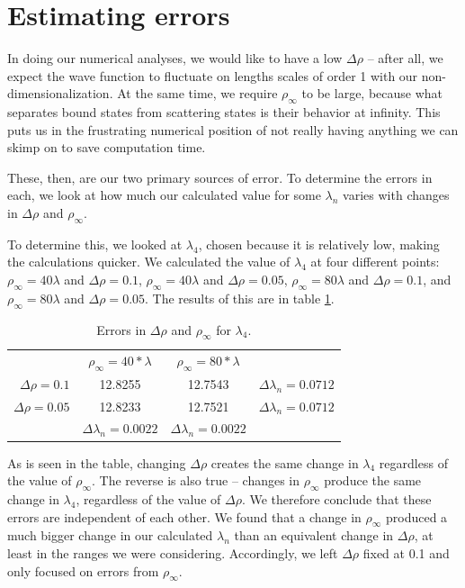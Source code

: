 \documentclass[12pt,twoside]{reedthesis}
\begin{document}
\section{Estimating errors}
In doing our numerical analyses, we would like to have a low $\Delta \rho$ -- after all, we expect the wave function to fluctuate on lengths scales of order 1 with our non-dimensionalization. At the same time, we require $\rho_{\infty}$ to be large, because what separates bound states from scattering states is their behavior at infinity. This puts us in the frustrating numerical position of not really having anything we can skimp on to save computation time.

These, then, are our two primary sources of error. To determine the errors in each, we look at how much our calculated value for some $\lambda_{n}$ varies with changes in $\Delta \rho$ and $\rho_{\infty}$.  

To determine this, we looked at $\lambda_{4}$, chosen because it is relatively low, making the calculations quicker. We calculated the value of $\lambda_{4}$ at four different points: $\rho_{\infty} = 40\lambda$ and $\Delta \rho = 0.1$, $\rho_{\infty} = 40\lambda$ and $\Delta \rho = 0.05$, $\rho_{\infty} = 80\lambda$ and $\Delta \rho = 0.1$, and $\rho_{\infty} = 80\lambda$ and $\Delta \rho = 0.05$. The results of this are in table \ref{tab:errorchanges}. 
\begin{table}
\centering
\begin{tabular}{r|c|c|c|}
\multicolumn{1}{r}{}
 &  \multicolumn{1}{c}{$\rho_{\infty} = 40*\lambda$}
 & \multicolumn{1}{c}{$\rho_{\infty} = 80*\lambda$}
 & \multicolumn{1}{l}{} \\
\cline{2-4}
$\Delta \rho = 0.1$ & 12.8255 & 12.7543 & $\Delta \lambda_n = 0.0712$\\
\cline{2-4}
$\Delta \rho = 0.05$ & 12.8233 & 12.7521& $\Delta \lambda_n = 0.0712$ \\
\cline{2-4}
\multicolumn{1}{r}{}
 &  \multicolumn{1}{|c|}{$\Delta \lambda_n = 0.0022$}
 & \multicolumn{1}{c|}{$\Delta \lambda_n = 0.0022$}
 & \multicolumn{1}{l}{} \\
 \cline{2-3}
\end{tabular}
\caption{Errors in $\Delta \rho$ and $\rho_{\infty}$ for $\lambda_4$.}
\label{tab:errorchanges}
\end{table}
As is seen in the table, changing $\Delta \rho$ creates the same change in $\lambda_4$ regardless of the value of $\rho_{\infty}$. The reverse is also true -- changes in $\rho_{\infty}$ produce the same change in $\lambda_4$, regardless of the value of $\Delta \rho$. We therefore conclude that these errors are independent of each other. We found that a change in $\rho_{\infty}$ produced a much bigger change in our calculated $\lambda_{n}$ than an equivalent change in $\Delta \rho$, at least in the ranges we were considering. Accordingly, we left $\Delta \rho$ fixed at 0.1 and only focused on errors from $\rho_{\infty}$.
 
\end{document}
